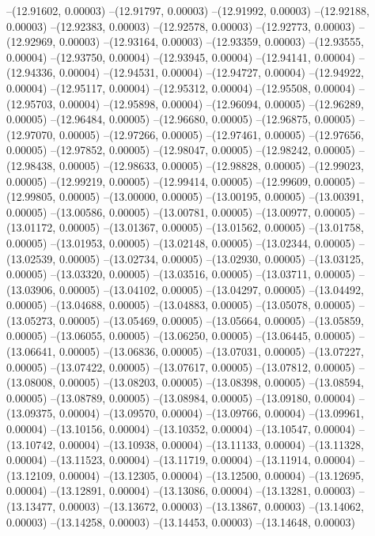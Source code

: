 --(12.91602, 0.00003)
--(12.91797, 0.00003)
--(12.91992, 0.00003)
--(12.92188, 0.00003)
--(12.92383, 0.00003)
--(12.92578, 0.00003)
--(12.92773, 0.00003)
--(12.92969, 0.00003)
--(12.93164, 0.00003)
--(12.93359, 0.00003)
--(12.93555, 0.00004)
--(12.93750, 0.00004)
--(12.93945, 0.00004)
--(12.94141, 0.00004)
--(12.94336, 0.00004)
--(12.94531, 0.00004)
--(12.94727, 0.00004)
--(12.94922, 0.00004)
--(12.95117, 0.00004)
--(12.95312, 0.00004)
--(12.95508, 0.00004)
--(12.95703, 0.00004)
--(12.95898, 0.00004)
--(12.96094, 0.00005)
--(12.96289, 0.00005)
--(12.96484, 0.00005)
--(12.96680, 0.00005)
--(12.96875, 0.00005)
--(12.97070, 0.00005)
--(12.97266, 0.00005)
--(12.97461, 0.00005)
--(12.97656, 0.00005)
--(12.97852, 0.00005)
--(12.98047, 0.00005)
--(12.98242, 0.00005)
--(12.98438, 0.00005)
--(12.98633, 0.00005)
--(12.98828, 0.00005)
--(12.99023, 0.00005)
--(12.99219, 0.00005)
--(12.99414, 0.00005)
--(12.99609, 0.00005)
--(12.99805, 0.00005)
--(13.00000, 0.00005)
--(13.00195, 0.00005)
--(13.00391, 0.00005)
--(13.00586, 0.00005)
--(13.00781, 0.00005)
--(13.00977, 0.00005)
--(13.01172, 0.00005)
--(13.01367, 0.00005)
--(13.01562, 0.00005)
--(13.01758, 0.00005)
--(13.01953, 0.00005)
--(13.02148, 0.00005)
--(13.02344, 0.00005)
--(13.02539, 0.00005)
--(13.02734, 0.00005)
--(13.02930, 0.00005)
--(13.03125, 0.00005)
--(13.03320, 0.00005)
--(13.03516, 0.00005)
--(13.03711, 0.00005)
--(13.03906, 0.00005)
--(13.04102, 0.00005)
--(13.04297, 0.00005)
--(13.04492, 0.00005)
--(13.04688, 0.00005)
--(13.04883, 0.00005)
--(13.05078, 0.00005)
--(13.05273, 0.00005)
--(13.05469, 0.00005)
--(13.05664, 0.00005)
--(13.05859, 0.00005)
--(13.06055, 0.00005)
--(13.06250, 0.00005)
--(13.06445, 0.00005)
--(13.06641, 0.00005)
--(13.06836, 0.00005)
--(13.07031, 0.00005)
--(13.07227, 0.00005)
--(13.07422, 0.00005)
--(13.07617, 0.00005)
--(13.07812, 0.00005)
--(13.08008, 0.00005)
--(13.08203, 0.00005)
--(13.08398, 0.00005)
--(13.08594, 0.00005)
--(13.08789, 0.00005)
--(13.08984, 0.00005)
--(13.09180, 0.00004)
--(13.09375, 0.00004)
--(13.09570, 0.00004)
--(13.09766, 0.00004)
--(13.09961, 0.00004)
--(13.10156, 0.00004)
--(13.10352, 0.00004)
--(13.10547, 0.00004)
--(13.10742, 0.00004)
--(13.10938, 0.00004)
--(13.11133, 0.00004)
--(13.11328, 0.00004)
--(13.11523, 0.00004)
--(13.11719, 0.00004)
--(13.11914, 0.00004)
--(13.12109, 0.00004)
--(13.12305, 0.00004)
--(13.12500, 0.00004)
--(13.12695, 0.00004)
--(13.12891, 0.00004)
--(13.13086, 0.00004)
--(13.13281, 0.00003)
--(13.13477, 0.00003)
--(13.13672, 0.00003)
--(13.13867, 0.00003)
--(13.14062, 0.00003)
--(13.14258, 0.00003)
--(13.14453, 0.00003)
--(13.14648, 0.00003)
